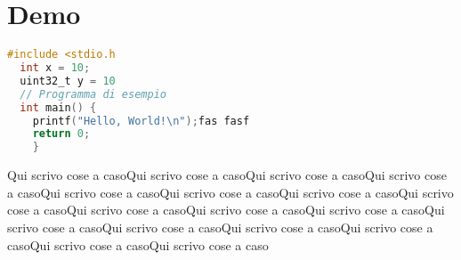 \chapter{Demo}

\centering
\begin{lstlisting}[language=C, style=hknc]
  #include <stdio.h
  int x = 10;
  uint32_t y = 10
  // Programma di esempio
  int main() {
    printf("Hello, World!\n");fas fasf
    return 0;
    }
\end{lstlisting}


Qui scrivo cose a casoQui scrivo cose a casoQui scrivo cose a casoQui scrivo cose a casoQui scrivo cose a casoQui scrivo cose a casoQui scrivo cose a casoQui scrivo cose a casoQui scrivo cose a casoQui scrivo cose a casoQui scrivo cose a casoQui scrivo cose a casoQui scrivo cose a casoQui scrivo cose a casoQui scrivo cose a casoQui scrivo cose a casoQui scrivo cose a caso

